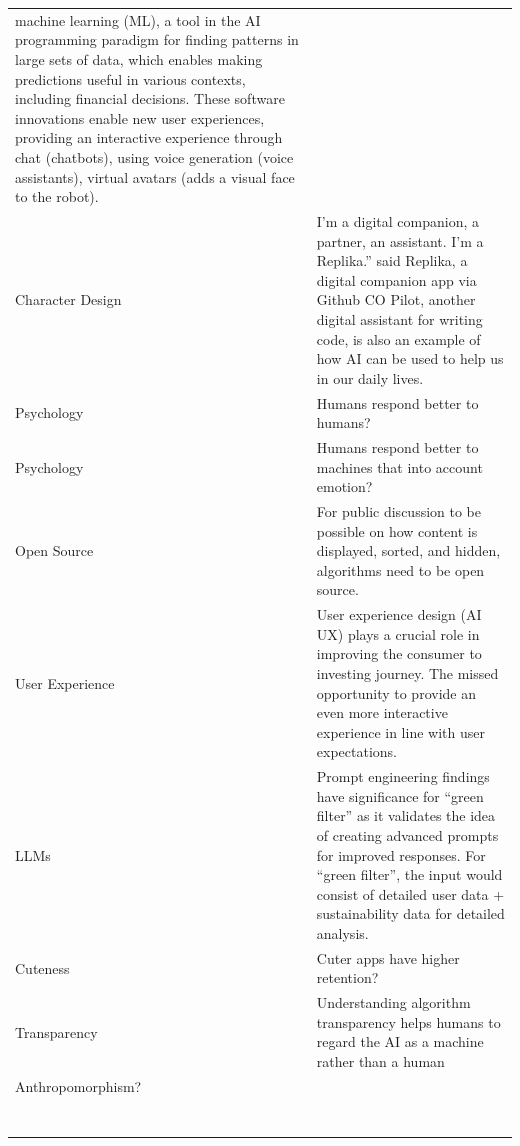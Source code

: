 \documentclass[
  letterpaper,
  DIV=11,
  numbers=noendperiod]{scrartcl}
\begin{document}
\begin{longtable}[]{@{}
  >{\raggedright\arraybackslash}p{}
  >{\raggedright\arraybackslash}p{}@{}}
machine learning (ML), a tool in the AI programming paradigm for finding
patterns in large sets of data, which enables making predictions useful
in various contexts, including financial decisions. These software
innovations enable new user experiences, providing an interactive
experience through chat (chatbots), using voice generation (voice
assistants), virtual avatars (adds a visual face to the robot). \\
Character Design & I'm a digital companion, a partner, an assistant. I'm
a Replika.'' said Replika, a digital companion app via Github CO Pilot,
another digital assistant for writing code, is also an example of how AI
can be used to help us in our daily lives. \\
Psychology & Humans respond better to humans? \\
Psychology & Humans respond better to machines that into account
emotion? \\
Open Source & For public discussion to be possible on how content is
displayed, sorted, and hidden, algorithms need to be open source. \\
User Experience & User experience design (AI UX) plays a crucial role in
improving the consumer to investing journey. The missed opportunity to
provide an even more interactive experience in line with user
expectations. \\
LLMs & Prompt engineering findings have significance for ``green
filter'' as it validates the idea of creating advanced prompts for
improved responses. For ``green filter'', the input would consist of
detailed user data + sustainability data for detailed analysis. \\
Cuteness & Cuter apps have higher retention? \\
Transparency & Understanding algorithm transparency helps humans to
regard the AI as a machine rather than a human \\
Anthropomorphism? & \\
& \\
& \\
& \\
& \\
& \\
& \\
& \\
\end{longtable}
\end{document}
